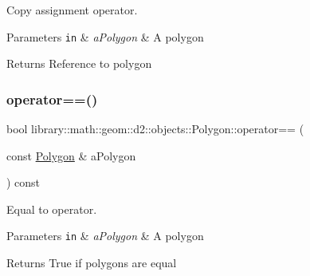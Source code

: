 Copy assignment operator. 


\begin{DoxyParams}[1]{Parameters}
\mbox{\tt in}  & {\em a\+Polygon} & A polygon \\
\hline
\end{DoxyParams}
\begin{DoxyReturn}{Returns}
Reference to polygon 
\end{DoxyReturn}
\mbox{\label{classlibrary_1_1math_1_1geom_1_1d2_1_1objects_1_1_polygon_a2d92051aa3535659ec1ca1849ea65fa0}} 
\subsubsection{\texorpdfstring{operator==()}{operator==()}}
{\footnotesize\ttfamily bool library\+::math\+::geom\+::d2\+::objects\+::\+Polygon\+::operator== (\begin{DoxyParamCaption}\item[{const \hyperlink{classlibrary_1_1math_1_1geom_1_1d2_1_1objects_1_1_polygon}{Polygon} \&}]{a\+Polygon }\end{DoxyParamCaption}) const}



Equal to operator. 


\begin{DoxyCode}
\end{DoxyCode}



\begin{DoxyParams}[1]{Parameters}
\mbox{\tt in}  & {\em a\+Polygon} & A polygon \\
\hline
\end{DoxyParams}
\begin{DoxyReturn}{Returns}
True if polygons are equal 
\end{DoxyReturn}
\mbox{\label{classlibrary_1_1math_1_1geom_1_1d2_1_1objects_1_1_polygon_ae5494a1f838d3c325899b6c46237bca8}} 
